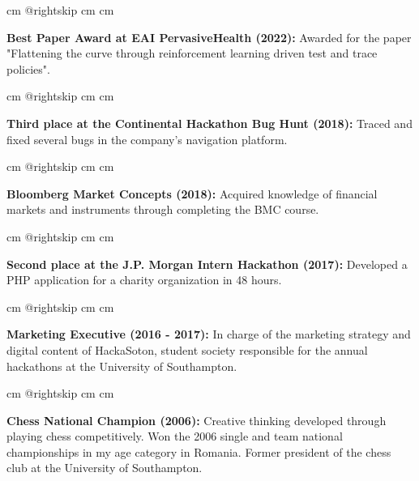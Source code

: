 \documentclass[10pt, letterpaper]{article}
\begin{document}
        \begingroup{} cm
        \advance\csname @rightskip cm
        \advance{} cm

        \textbf{Best Paper Award at EAI PervasiveHealth (2022):} Awarded for the paper "Flattening the curve through reinforcement learning driven test and trace policies". \par\endgroup

        \vspace{0.2 cm}
        \begingroup{} cm
        \advance\csname @rightskip cm
        \advance{} cm

        \textbf{Third place at the Continental Hackathon Bug Hunt (2018):} Traced and fixed several bugs in the company's navigation platform. \par\endgroup

        \vspace{0.2 cm}
        \begingroup{} cm
        \advance\csname @rightskip cm
        \advance{} cm

        \textbf{Bloomberg Market Concepts (2018):} Acquired knowledge of financial markets and instruments through completing the BMC course. \par\endgroup

        \vspace{0.2 cm}
        \begingroup{} cm
        \advance\csname @rightskip cm
        \advance{} cm

        \textbf{Second place at the J.P. Morgan Intern Hackathon (2017):} Developed a PHP application for a charity organization in 48 hours. \par\endgroup

        \vspace{0.2 cm}
        \begingroup{} cm
        \advance\csname @rightskip cm
        \advance{} cm

        \textbf{Marketing Executive (2016 - 2017):} In charge of the marketing strategy and digital content of HackaSoton, student society responsible for the annual hackathons at the University of Southampton. \par\endgroup

        \vspace{0.2 cm}
        \begingroup{} cm
        \advance\csname @rightskip cm
        \advance{} cm

        \textbf{Chess National Champion (2006):} Creative thinking developed through playing chess competitively. Won the 2006 single and team national championships in my age category in Romania. Former president of the chess club at the University of Southampton. \par\endgroup
\end{document}
